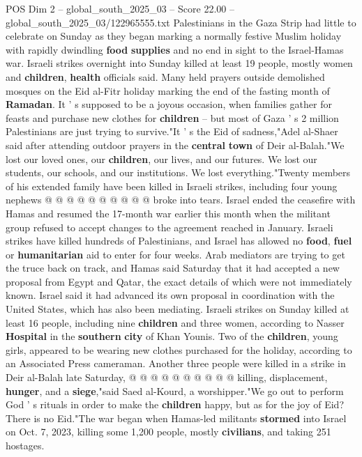 \begin{textsample}{POS Dim 2 – global\_south\_2025\_03 – Score 22.00 – global\_south\_2025\_03/122965555.txt}  \label{ex:f2_pos_309}
Palestinians in the Gaza Strip had little to celebrate on Sunday as they began marking a normally festive Muslim holiday with rapidly dwindling \textbf{food} \textbf{supplies} and no end in sight to the Israel-Hamas war.
Israeli strikes overnight into Sunday killed at least 19 people, mostly women and \textbf{children}, \textbf{health} officials said.
Many held prayers outside demolished mosques on the Eid al-Fitr holiday marking the end of the fasting month of \textbf{Ramadan}.
It ' s supposed to be a joyous occasion, when families gather for feasts and purchase new clothes for \textbf{children} -- but most of Gaza ' s 2 million Palestinians are just trying to survive."It ' s the Eid of sadness,"Adel al-Shaer said after attending outdoor prayers in the \textbf{central} \textbf{town} of Deir al-Balah."We lost our loved ones, our \textbf{children}, our lives, and our futures.
We lost our students, our schools, and our institutions.
We lost everything."Twenty members of his extended family have been killed in Israeli strikes, including four young nephews @ @ @ @ @ @ @ @ @ @ broke into tears.
Israel ended the ceasefire with Hamas and resumed the 17-month war earlier this month when the militant group refused to accept changes to the agreement reached in January.
Israeli strikes have killed hundreds of Palestinians, and Israel has allowed no \textbf{food}, \textbf{fuel} or \textbf{humanitarian} aid to enter for four weeks.
Arab mediators are trying to get the truce back on track, and Hamas said Saturday that it had accepted a new proposal from Egypt and Qatar, the exact details of which were not immediately known.
Israel said it had advanced its own proposal in coordination with the United States, which has also been mediating.
Israeli strikes on Sunday killed at least 16 people, including nine \textbf{children} and three women, according to Nasser \textbf{Hospital} in the \textbf{southern} \textbf{city} of Khan Younis.
Two of the \textbf{children}, young girls, appeared to be wearing new clothes purchased for the holiday, according to an Associated Press cameraman.
Another three people were killed in a strike in Deir al-Balah late Saturday, @ @ @ @ @ @ @ @ @ @ killing, displacement, \textbf{hunger}, and a \textbf{siege},"said Saed al-Kourd, a worshipper."We go out to perform God ' s rituals in order to make the \textbf{children} happy, but as for the joy of Eid?
There is no Eid."The war began when Hamas-led militants \textbf{stormed} into Israel on Oct. 7, 2023, killing some 1,200 people, mostly \textbf{civilians}, and taking 251 hostages.

\end{textsample}
